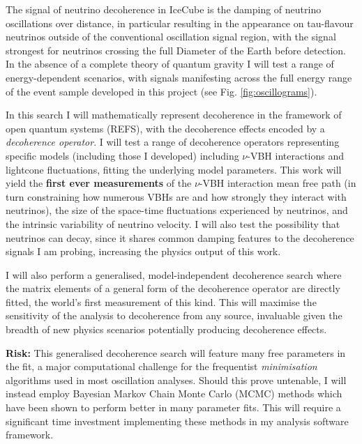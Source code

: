 \documentclass[a4paper,11pt]{article}
\begin{document}
The signal of neutrino decoherence in IceCube is the damping of neutrino oscillations over distance, in particular resulting in the appearance on tau-flavour neutrinos outside of the conventional oscillation signal region, with the signal strongest for neutrinos crossing the full Diameter of the Earth before detection. In the absence of a complete theory of quantum gravity I will test a range of energy-dependent scenarios, with signals manifesting across the full energy range of the event sample developed in this project (see Fig. \ref{fig:oscillograms}).

In this search I will mathematically represent decoherence in the framework of open quantum systems (REFS), with the decoherence effects encoded by a \textit{decoherence operator}. I will test a range of decoherence operators representing specific models (including those I developed) including $\nu$-VBH interactions and lightcone fluctuations, fitting the underlying model parameters. This work will yield the \textbf{first ever measurements} of the $\nu$-VBH interaction mean free path (in turn constraining how numerous VBHs are and how strongly they interact with neutrinos), the size of the space-time fluctuations experienced by neutrinos, and the intrinsic variability of neutrino velocity. I will also test the possibility that neutrinos can decay, since it shares common damping features to the decoherence signals I am probing, increasing the physics output of this work.

I will also perform a generalised, model-independent decoherence search where the matrix elements of a general form of the decoherence operator are directly fitted, the world's first measurement of this kind. This will maximise the sensitivity of the analysis to decoherence from any source, invaluable given the breadth of new physics scenarios potentially producing decoherence effects. 

\textbf{Risk:} This generalised decoherence search will feature many free parameters in the fit, a major computational challenge for the frequentist \textit{minimisation} algorithms used in most oscillation analyses. Should this prove untenable, I will instead employ Bayesian Markov Chain Monte Carlo (MCMC) methods which have been shown to perform better in many parameter fits. This will require a significant time investment implementing these methods in my analysis software framework.
\end{document}

